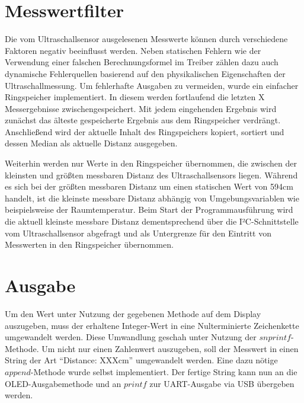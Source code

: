 \documentclass[parskip,
							 oneside,
							 11pt,
							 noheadingspace,
							 accentcolor=tud1d,
							 bigchapter,
							 colorback]{tudreport}
\begin{document}
\section{Messwertfilter}


Die vom Ultraschallsensor ausgelesenen Messwerte können durch verschiedene Faktoren negativ beeinflusst werden. Neben statischen Fehlern wie der Verwendung einer falschen Berechnungsformel im Treiber zählen dazu auch dynamische Fehlerquellen basierend auf den physikalischen Eigenschaften der Ultraschallmessung. Um fehlerhafte Ausgaben zu vermeiden, wurde ein einfacher Ringspeicher implementiert. In diesem werden fortlaufend die letzten X Messergebnisse zwischengespeichert. Mit jedem eingehenden Ergebnis wird zunächst das älteste gespeicherte Ergebnis aus dem Ringspeicher verdrängt. Anschließend wird der aktuelle Inhalt des Ringspeichers kopiert, sortiert und dessen Median als aktuelle Distanz ausgegeben.

Weiterhin werden nur Werte in den Ringspeicher übernommen, die zwischen der kleinsten und größten messbaren Distanz des Ultraschallsensors liegen. Während es sich bei der größten messbaren Distanz um einen statischen Wert von 594cm handelt, ist die kleinste messbare Distanz abhängig von Umgebungsvariablen wie beispielsweise der Raumtemperatur. Beim Start der Programmausführung wird die aktuell kleinste messbare Distanz dementsprechend über die I²C-Schnittstelle vom Ultraschallsensor abgefragt und als Untergrenze für den Eintritt von Messwerten in den Ringspeicher übernommen.

\section{Ausgabe}
Um den Wert unter Nutzung der gegebenen Methode auf dem Display auszugeben, muss der erhaltene Integer-Wert in eine Nulterminierte Zeichenkette umgewandelt werden. Diese Umwandlung geschah unter Nutzung der $snprintf$-Methode. Um nicht nur einen Zahlenwert auszugeben, soll der Messwert in einen String der Art ``Distance:  XXXcm'' umgewandelt werden. Eine dazu nötige $append$-Methode wurde selbst implementiert. Der fertige String kann nun an die OLED-Ausgabemethode und an $printf$ zur UART-Ausgabe via USB übergeben werden. 










\clearpage

\end{document}
